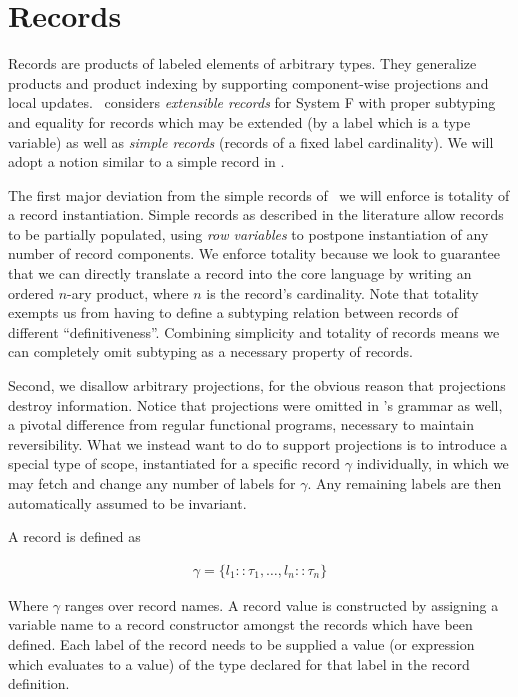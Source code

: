\section{Records}

Records are products of labeled elements of arbitrary types. They generalize
products and product indexing by supporting component-wise projections and
local updates.~\cite{Cardelli:1992} considers \emph{extensible records} for
System F with proper subtyping and equality for records which may be extended
(by a label which is a type variable) as well as \emph{simple records}
(records of a fixed label cardinality). We will adopt a notion similar to a
simple record in \rfunc.

The first major deviation from the simple records of~\cite{Cardelli:1992} we
will enforce is totality of a record instantiation. Simple records as described
in the literature allow records to be partially populated, using \emph{row
variables} to postpone instantiation of any number of record components. We
enforce totality because we look to guarantee that we can directly translate a
record into the core language by writing an ordered $n$-ary product, where $n$
is the record's cardinality. Note that totality exempts us from having to define a
subtyping relation between records of different ``definitiveness''. Combining
simplicity and totality of records means we can completely omit subtyping as a
necessary property of records.

Second, we disallow arbitrary projections, for the obvious reason that
projections destroy information. Notice that projections were omitted in
\rfunc's grammar as well, a pivotal difference from regular functional
programs, necessary to maintain reversibility. What we instead want to do to
support projections is to introduce a special type of scope, instantiated for a
specific record $\gamma$ individually, in which we may fetch and change any
number of labels for $\gamma$. Any remaining labels are then automatically
assumed to be invariant.

A record is defined as

\begin{align*}
  \gamma = \{ l_1 :: \tau_1, \dots, l_n :: \tau_n  \}
\end{align*}

Where $\gamma$ ranges over record names. A record value is constructed by
assigning a variable name to a record constructor amongst the records which
have been defined. Each label of the record needs to be supplied a value (or
expression which evaluates to a value) of the type declared for that label in
the record definition.

